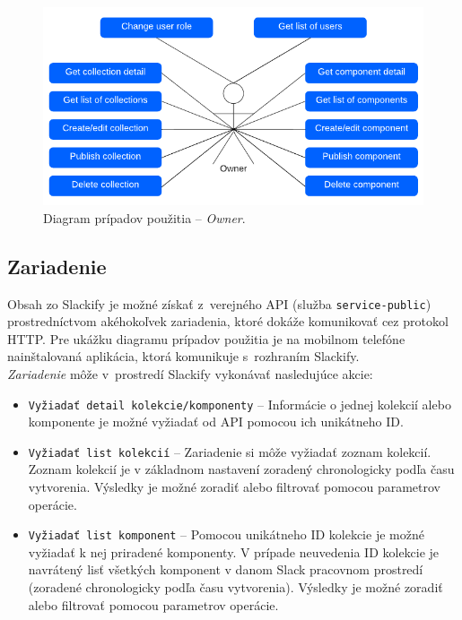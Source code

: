 \begin{figure}[h]
	\centering
	\includegraphics[scale=0.9]{obrazky-figures/owner_use_case}
	\caption{Diagram prípadov použitia -- \emph{Owner}.}
\end{figure}

\subsection{Zariadenie}
Obsah zo Slackify je možné získať z~verejného API (služba \texttt{service-public}) prostredníctvom akéhokoľvek zariadenia, ktoré dokáže komunikovať cez protokol HTTP. Pre ukážku diagramu prípadov použitia je na mobilnom telefóne nainštalovaná aplikácia, ktorá komunikuje s~rozhraním Slackify. \\

\noindent \emph{Zariadenie} môže v~prostredí Slackify vykonávať nasledujúce akcie:

\begin{itemize}
	\item \texttt{Vyžiadať detail kolekcie/komponenty} -- Informácie o jednej kolekcií alebo komponente je možné vyžiadať od API pomocou ich unikátneho ID.
	\item \texttt{Vyžiadať list kolekcií} -- Zariadenie si môže vyžiadať zoznam kolekcií. Zoznam kolekcií je v základnom nastavení zoradený chronologicky podľa času vytvorenia. Výsledky je možné zoradiť alebo filtrovať pomocou parametrov operácie.
	\item \texttt{Vyžiadať list komponent} -- Pomocou unikátneho ID kolekcie je možné vyžiadať k nej priradené komponenty. V prípade neuvedenia ID kolekcie je navrátený lisť všetkých komponent v danom Slack pracovnom prostredí (zoradené chronologicky podľa času vytvorenia). Výsledky je možné zoradiť alebo filtrovať pomocou parametrov operácie.
\end{itemize}

